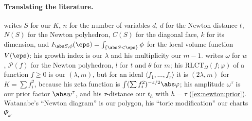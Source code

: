 \begin{refsection}
\paragraph{Translating the literature.} \Textcite{Greenblatt2010} writes $S$ for our $K$, $n$ for the number of variables $d$, $d$ for the Newton distance $t$, $N(S)$ for the Newton polyhedron, $C(S)$ for the diagonal face, $k$ for its dimension, and $I_{\abs S,\phi}(\eps)=\int_{\{\abs S<\eps\}}\phi$ for the local volume function $V(\eps)$; his growth index is our $\lambda$ and his multiplicity our $m-1$. \Textcite{Lin2017} writes $\omega$ for $w$, $\mathcal P(f)$ for the Newton polyhedron, $l$ for $t$ and $\theta$ for $m$; his $\mathrm{RLCT}_\Omega(f;\varphi)$ of a function $f\ge0$ is our $(\lambda,m)$, but for an ideal $\langle f_1,\dots,f_r\rangle$ it is $(2\lambda,m)$ for $K=\sum f_i^2$, because his zeta function is $\int(\sum f_i^2)^{-z/2}\abs\varphi$; his amplitude $\omega^\tau$ is our prior factor $\abs w^\tau$, and his $\tau$-distance our $t_h$ with $h=\tau$ (\cref{ex:newton:prior}). Watanabe's ``Newton diagram'' is our polygon, his ``toric modification'' our charts $\Psi_k$.

\printchapterbib
\end{refsection}
